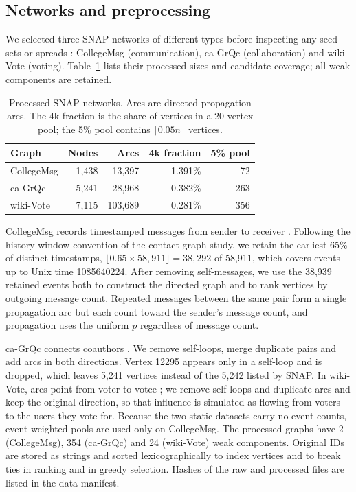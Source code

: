 \documentclass[smallextended]{svjour3}
\begin{document}
\subsection{Networks and preprocessing}
We selected three SNAP networks of different types before inspecting any seed sets or spreads \cite{snap}: CollegeMsg (communication), ca-GrQc (collaboration) and wiki-Vote (voting). Table~\ref{tab:data} lists their processed sizes and candidate coverage; all weak components are retained.
\begin{table}[htbp]
\caption{Processed SNAP networks. Arcs are directed propagation arcs. The 4k fraction is the share of vertices in a 20-vertex pool; the 5\% pool contains $\lceil 0.05n\rceil$ vertices.}\label{tab:data}
\begin{tabular}{lrrrr}
\toprule
Graph & Nodes & Arcs & 4k fraction & 5\% pool \\
\midrule
CollegeMsg & 1,438 & 13,397 & 1.391\% & 72 \\
ca-GrQc & 5,241 & 28,968 & 0.382\% & 263 \\
wiki-Vote & 7,115 & 103,689 & 0.281\% & 356 \\
\bottomrule
\end{tabular}
\end{table}

CollegeMsg records timestamped messages from sender to receiver \cite{college}. Following the history-window convention of the contact-graph study, we retain the earliest 65\% of distinct timestamps, $\lfloor 0.65\times58{,}911\rfloor=38{,}292$ of 58,911, which covers events up to Unix time 1085640224. After removing self-messages, we use the 38,939 retained events both to construct the directed graph and to rank vertices by outgoing message count. Repeated messages between the same pair form a single propagation arc but each count toward the sender's message count, and propagation uses the uniform $p$ regardless of message count.

ca-GrQc connects coauthors \cite{grqc}. We remove self-loops, merge duplicate pairs and add arcs in both directions. Vertex 12295 appears only in a self-loop and is dropped, which leaves 5,241 vertices instead of the 5,242 listed by SNAP. In wiki-Vote, arcs point from voter to votee \cite{signed,links}; we remove self-loops and duplicate arcs and keep the original direction, so that influence is simulated as flowing from voters to the users they vote for. Because the two static datasets carry no event counts, event-weighted pools are used only on CollegeMsg. The processed graphs have 2 (CollegeMsg), 354 (ca-GrQc) and 24 (wiki-Vote) weak components. Original IDs are stored as strings and sorted lexicographically to index vertices and to break ties in ranking and in greedy selection. Hashes of the raw and processed files are listed in the data manifest.
\end{document}
